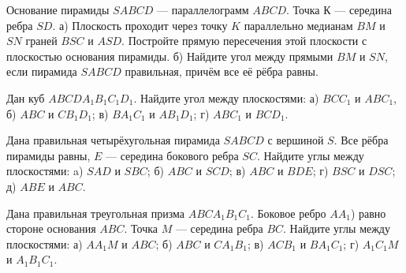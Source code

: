 \begin{class}[number=3]
	\begin{listofex}
		\item Основание пирамиды \(SABCD\) --- параллелограмм \(ABCD\). Точка К --- середина ребра \(SD\). а) Плоскость проходит через точку \(K\) параллельно медианам \(BM\) и \(SN\) граней \(BSC\) и \(ASD\). Постройте прямую пересечения этой плоскости с плоскостью основания пирамиды. б) Найдите угол между прямыми \(BM\) и \(SN\), если пирамида \(SABCD\) правильная, причём все её рёбра равны.
		\item Дан куб \(ABCDA_1B_1C_1D_1\). Найдите угол между плоскостями: а) \(BCC_1\) и \(ABC_1\), б) \(ABC\) и \(CB_1D_1\); в) \(BA_1C_1\) и \(AB_1D_1\); г) \(ABC_1\) и \(BCD_1\).
		\item Дана правильная четырёхугольная пирамида \(SABCD\) с вершиной \(S\). Все рёбра пирамиды равны, \(E\) — середина бокового ребра \(SC\). Найдите углы между плоскостями: a) \(SAD\) и \(SBC\); б) \(ABC\) и \(SCD\); в) \(ABC\) и \(BDE\); г) \(BSC\) и \(DSC\); д) \(ABE\) и \(ABC\).
		\item Дана правильная треугольная призма \(ABCA_1B_1C_1\). Боковое ребро \(AA_1\)) равно стороне основания \(ABC\). Точка \(M\) — середина ребра \(BC\). Найдите углы между плоскостями: а) \(AA_1M\) и \(ABC\); б) \(ABC\) и \(CA_1B_1\); в) \(ACB_1\) и \(BA_1C_1\); г) \(A_1C_1M\) и \(A_1B_1C_1\).
	\end{listofex}
\end{class}

